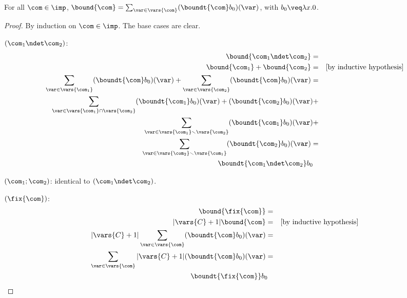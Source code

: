 \begin{lemma}
  For all \(\com \in \imp\), \(\bound{\com}=\sum_{\var\in \vars{\com}}
  (\boundt{\com}b_0)(\var)\), with \(b_0\veq \lambda x.0\).
\end{lemma}
\begin{proof}
  By induction on \(\com\in \imp\). The base cases are clear. 

  \noindent
  \((\com_1 \ndet \com_2)\):
  \begin{align*}
    \bound{\com_1 \ndet \com_2} =&\\
    \bound{\com_1} + \bound{\com_2} = & \quad \text{[by inductive hypothesis]}\\
    \sum_{\var\in \vars{\com_1}} (\boundt{\com}b_0)(\var) + \sum_{\var\in \vars{\com_2}} (\boundt{\com}b_0)(\var) =&\\
    \sum_{\var\in \vars{\com_1}\cap \vars{\com_2}} (\boundt{\com_1}b_0)(\var)+(\boundt{\com_2}b_0)(\var) +&\\
    \sum_{\var\in \vars{\com_1}\smallsetminus \vars{\com_2}} (\boundt{\com_1}b_0)(\var) +&\\
    \sum_{\var\in \vars{\com_2}\smallsetminus \vars{\com_1}} (\boundt{\com_2}b_0)(\var) =&\\
    \boundt{\com_1 \ndet \com_2}b_0 \phantom{=}&
  \end{align*}

  \noindent
  \((\com_1; \com_2)\): identical to \((\com_1 \ndet \com_2)\).

  \medskip
  \noindent
  \((\fix{\com})\):
  \begin{align*}
    \bound{\fix{\com}} =&\\
    |\vars{C}+1|\bound{\com} = & \quad \text{[by inductive hypothesis]}\\
    |\vars{C}+1|\sum_{\var\in \vars{\com}} (\boundt{\com}b_0)(\var)=&\\
    \sum_{\var\in \vars{\com}} |\vars{C}+1|(\boundt{\com}b_0)(\var)=&\\
    \boundt{\fix{\com}}b_0\phantom{=}&
  \end{align*}
\end{proof}
 
